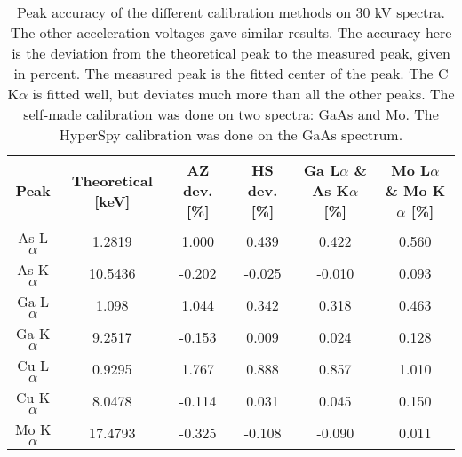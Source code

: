 
\begin{table}[p]
    \centering
    \caption{
        Peak accuracy of the different calibration methods on 30 kV spectra.
        The other acceleration voltages gave similar results.
        The accuracy here is the deviation from the theoretical peak to the measured peak, given in percent.
        The measured peak is the fitted center of the peak.
        The C K$\alpha$ is fitted well, but deviates much more than all the other peaks.
        The self-made calibration was done on two spectra: GaAs and Mo. %
        The HyperSpy calibration was done on the GaAs spectrum.
    }
    \label{tab:results:calibration-peak-accuracy}
    \begin{tabular}{cccccc}
        Peak         & Theoretical [keV] & AZ dev. [\%] & HS dev. [\%] & Ga L{$\alpha$} \& As K{$\alpha$} [\%] & Mo L{$\alpha$} \& Mo K{$\alpha$} [\%] \\
        \hline
        As L$\alpha$ & 1.2819            & 1.000        & 0.439        & 0.422                                 & 0.560                                 \\
        As K$\alpha$ & 10.5436           & -0.202       & -0.025       & -0.010                                & 0.093                                 \\
        Ga L$\alpha$ & 1.098             & 1.044        & 0.342        & 0.318                                 & 0.463                                 \\
        Ga K$\alpha$ & 9.2517            & -0.153       & 0.009        & 0.024                                 & 0.128                                 \\
        Cu L$\alpha$ & 0.9295            & 1.767        & 0.888        & 0.857                                 & 1.010                                 \\
        Cu K$\alpha$ & 8.0478            & -0.114       & 0.031        & 0.045                                 & 0.150                                 \\
        Mo K$\alpha$ & 17.4793           & -0.325       & -0.108       & -0.090                                & 0.011                                 \\

\end{tabular}
\end{table}

